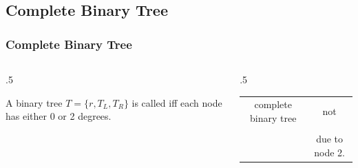 \documentclass[10pt]{beamer}
\begin{document}
\subsection{Complete Binary Tree}
\begin{frame}[t]\frametitle{Complete Binary Tree}
	\begin{columns}[T] %
	\begin{column}{.5\linewidth} %
		\begin{definition}
			 A binary tree $T = \{ r, T_{L}, T_{R} \}$ is called 
			 iff
			 each node has either 0 or 2 degrees.
		\end{definition}
	\end{column} %
	\begin{column}{.5\linewidth} %
		\begin{example}
		{\scriptsize
			\begin{tabular}{c c}
			complete binary tree
			&
			not
			\\
			
			&
			\\
			~
			&
			due to node 2.
			\end{tabular}
		} %
		\end{example}
	\end{column} %
	\end{columns} %
\end{frame}
\end{document}
